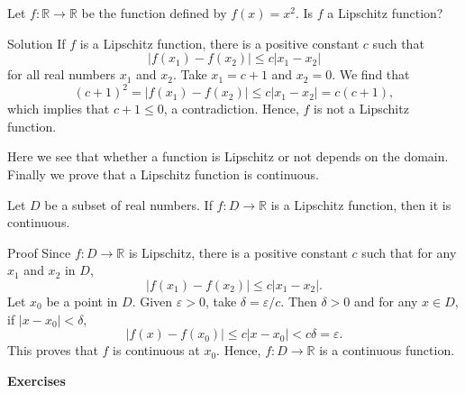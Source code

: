 \begin{example}{}
Let $f:\mathbb{R}\rightarrow \mathbb{R}$ be the function defined by $f(x)=x^2$. Is $f$ a Lipschitz function?
\end{example}
\begin{solution}{Solution}
If $f$ is a Lipschitz function, there is a positive constant $c$ such that
\[|f(x_1)-f(x_2)|\leq c|x_1-x_2|\] for all real numbers $x_1$ and $x_2$. 
 Take   $x_1=c+1$ and $x_2=0$. We find that
\[(c+1)^2=|f(x_1)-f(x_2)|\leq c|x_1-x_2|= c(c+1),\] which implies that $c+1\leq 0$, a contradiction.
Hence, $f$ is not a Lipschitz function.
\end{solution}

Here we see that whether a function is Lipschitz or not depends on the domain.
Finally we prove that a Lipschitz function is continuous. 

\begin{theorem}[label=23021005]{}
Let $D$ be a subset of real numbers. If $f:D\rightarrow\mathbb{R}$ is a Lipschitz function, then it is continuous.
\end{theorem}
\begin{myproof}{Proof}
Since $f:D\rightarrow\mathbb{R}$ is Lipschitz,  there is a positive constant $c$ such that for any $x_1$ and $x_2$ in $D$,
\[|f(x_1)-f(x_2)|\leq c|x_1-x_2|.\]Let $x_0$ be a point in $D$. Given $\varepsilon>0$, take $\delta =\varepsilon/c$. Then $\delta>0$ and for any $x\in D$, if $|x-x_0|<\delta$,
\[|f(x)-f(x_0)|\leq c|x-x_0|<c\delta=\varepsilon.\] This proves that $f$ is continuous at $x_0$. Hence, $f:D\rightarrow\mathbb{R}$ is a continuous function.
\end{myproof}
\vp

\noindent
{\bf \large Exercises  \thesection}
\setcounter{myquestion}{1}



